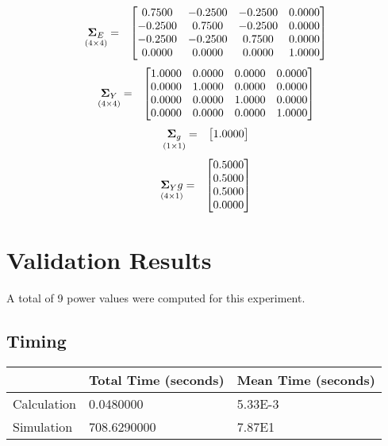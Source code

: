 \documentclass{glimmpse-report}
\begin{document}
\begin{eqnarray*}
\underset{\left(4\times4\right)}{\mathbf{\Sigma}_E} & = & \begin{bmatrix}0.7500 & -0.2500 & -0.2500 & 0.0000\protect\\
-0.2500 & 0.7500 & -0.2500 & 0.0000\protect\\
-0.2500 & -0.2500 & 0.7500 & 0.0000\protect\\
0.0000 & 0.0000 & 0.0000 & 1.0000\protect\\
\end{bmatrix}
\end{eqnarray*}
\begin{eqnarray*}
\underset{\left(4\times4\right)}{\mathbf{\Sigma}_Y} & = & \begin{bmatrix}1.0000 & 0.0000 & 0.0000 & 0.0000\protect\\
0.0000 & 1.0000 & 0.0000 & 0.0000\protect\\
0.0000 & 0.0000 & 1.0000 & 0.0000\protect\\
0.0000 & 0.0000 & 0.0000 & 1.0000\protect\\
\end{bmatrix}
\end{eqnarray*}
\begin{eqnarray*}
\underset{\left(1\times1\right)}{\mathbf{\Sigma}_g} & = & \begin{bmatrix}1.0000\protect\\
\end{bmatrix}
\end{eqnarray*}
\begin{eqnarray*}
\underset{\left(4\times1\right)}{\mathbf{\Sigma}_Yg} & = & \begin{bmatrix}0.5000\protect\\
0.5000\protect\\
0.5000\protect\\
0.0000\protect\\
\end{bmatrix}
\end{eqnarray*}
\section{Validation Results}
A total of 9 power values were computed for this experiment.

\subsection{Timing}
\begin{tabular}{|l|l|l|}
\hline
 & Total Time (seconds) & Mean Time (seconds) \\ 
\hline
Calculation & 0.0480000 & 5.33E-3\tabularnewline
\hline
Simulation & 708.6290000 & 7.87E1\tabularnewline
\hline
\end{tabular}
\end{document}
